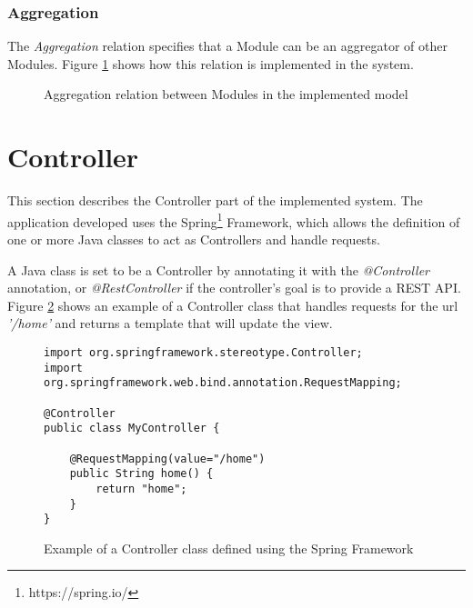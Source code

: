 \subsubsection{Aggregation}

The \textit{Aggregation} relation specifies that a Module can be an aggregator of other Modules. Figure \ref{figure:modelAggregationRelation} shows how this relation is implemented in the system.

\begin{figure}[h]
\centering
\renewcommand {\umltextcolor}{black}
\renewcommand {\umlfillcolor}{none}
\renewcommand {\umldrawcolor}{black}
\caption{Aggregation relation between Modules in the implemented model}
\label{figure:modelAggregationRelation}
\end{figure}

\section{Controller}

This section describes the Controller part of the implemented system. The application developed uses the Spring\footnote{https://spring.io/} Framework, which allows the definition of one or more Java classes to act as Controllers and handle requests.

A Java class is set to be a Controller by annotating it with the \textit{@Controller} annotation, or \textit{@RestController} if the controller's goal is to provide a REST API. Figure \ref{figure:springController} shows an example of a Controller class that handles requests for the url \textit{'/home'} and returns a template that will update the view.

\begin{figure}[h]
\lstset{style=customjava}
\begin{lstlisting}
import org.springframework.stereotype.Controller;
import org.springframework.web.bind.annotation.RequestMapping;

@Controller
public class MyController {

	@RequestMapping(value="/home")
	public String home() {
		return "home";
	}
}
\end{lstlisting}
\caption{Example of a Controller class defined using the Spring Framework} 
\label{figure:springController}
\end{figure}

